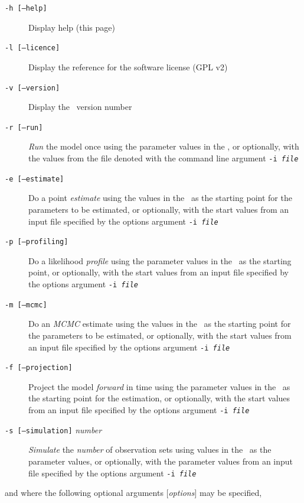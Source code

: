 \begin{description}
\item [\texttt{-h [--help]}] Display help (this page)
\item [\texttt{-l [--licence]}] Display the reference for the software license (GPL v2)
\item [\texttt{-v [--version]}] Display the \CNAME\ version number

\item [\texttt{-r [--run]}] \emph{Run} the model once using the parameter values in the \config, or optionally, with the values from the file denoted with the command line argument \texttt{-i \emph{file}}

\item [\texttt{-e [--estimate]}] Do a point \emph{estimate} using the values in the \config\ as the starting point for the parameters to be estimated, or optionally, with the start values from an input file specified by the options argument \texttt{-i \emph{file}}

\item [\texttt{-p [--profiling]}] Do a likelihood \emph{profile} using the parameter values in the \config\ as the starting point, or optionally, with the start values from an input file specified by the options argument \texttt{-i \emph{file}}

\item [\texttt{-m [--mcmc]}] Do an \emph{MCMC} estimate using the values in the \config\ as the starting point for the parameters to be estimated, or optionally, with the start values from an input file specified by the options argument \texttt{-i \emph{file}}

\item [\texttt{-f [--projection]}] Project the model \emph{forward} in time using the parameter values in the \config\ as the starting point for the estimation, or optionally,  with the start values from an input file specified by the options argument \texttt{-i \emph{file}} 

\item [\texttt{-s [--simulation]} \emph{number}] \emph{Simulate} the \emph{number} of observation sets using values in the \config\ as the parameter values, or optionally, with the parameter values from an input file specified by the options argument \texttt{-i \emph{file}}
\end{description}

and where the following optional arguments [\emph{options}] may be specified,

